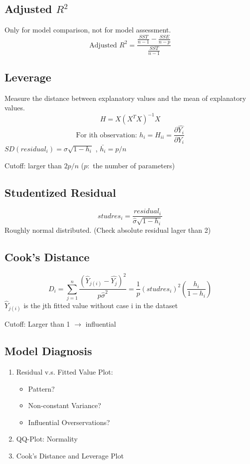 \documentclass[10pt,landscape, fleqn]{article}
\begin{document}
\begin{multicols}{3}
			\subsection{Adjusted $R^2$}
				Only for model comparison, not for model assessment.
				\[ \mbox{Adjusted } R^2 = \frac{\frac{SST}{n-1}-\frac{SSE}{n-p}}{\frac{SST}{n-1}} \]			
			\subsection{Leverage}
				Measure the distance between explanatory values and the mean of explanatory values. 
				\[ H = X(X^TX)^{-1}X \]
				\[ \mbox{For ith observation: } h_i = H_{ii}  = \frac{\partial \hat{Y_i}}{\partial Y_i}\] 
				$SD(residual_i) = \sigma\sqrt{1-h_i}$ , $\bar{h_i} = p/n$ \par 
				Cutoff: larger than $2p/n$ ($p: $ the number of parameters)
			\subsection{Studentized Residual}
				\[ studres_i = \frac{residual_i}{\hat{\sigma}\sqrt{1-h_i}} \]
				Roughly normal distributed. (Check absolute residual lager than 2)
			\subsection{Cook's Distance}
				\[ D_i = \sum_{j=1}^{n}\frac{(\hat{Y}_{j(i)}-\hat{Y_j})^2}{p\hat{\sigma}^2} 
				       = \frac{1}{p}(studres_i)^2(\frac{h_i}{1-h_i})\]
				$\hat{Y}_{j(i)}$ is the jth fitted value without case i in the dataset \par
				Cutoff: Larger than 1 $\rightarrow$ influential
			\subsection{Model Diagnosis}
				\begin{enumerate}
					\item Residual v.s. Fitted Value Plot:
						\begin{itemize}
							\item Pattern?
							\item Non-constant Variance?
							\item Influential Overservations?
						\end{itemize}
					\item QQ-Plot: Normality
					\item Cook's Distance and Leverage Plot
				\end{enumerate}
				

\end{multicols}
\end{document}
